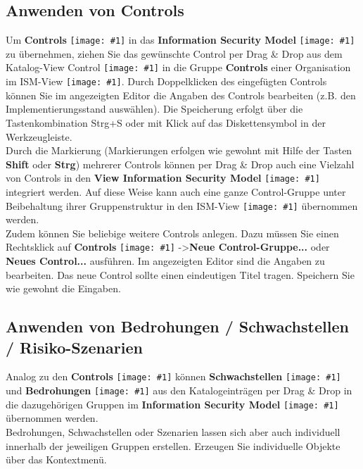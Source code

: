 \documentclass[a4paper,10pt]{book}
\newcommand{\icon}[1]{\texttt{[image: \#1]}}
\begin{document}
\subsection{Anwenden von Controls}
Um \textbf{Controls} \icon{Icon/Controls.png} in das \textbf{Information Security Model} \icon{Icon/Informationssicherheitsmodell.png} zu übernehmen,
ziehen Sie das gewünschte Control per Drag \& Drop aus dem Katalog-View Control \icon{Icon/Control_Kataloge.png} in die Gruppe
\textbf{Controls} einer Organisation im ISM-View \icon{Icon/Informationssicherheitsmodell.png}. Durch Doppelklicken des eingefügten
Controls können Sie im angezeigten Editor die Angaben des Controls bearbeiten (z.B. den Implementierungsstand auswählen).
Die Speicherung erfolgt über die Tastenkombination Strg+S oder mit Klick auf das Diskettensymbol in der Werkzeugleiste.
\newline\\
Durch die Markierung (Markierungen erfolgen wie gewohnt mit Hilfe der Tasten \textbf{Shift} oder \textbf{Strg}) mehrerer Controls können
per Drag \& Drop auch eine Vielzahl von Controls in den \textbf{View Information Security Model} \icon{Icon/Informationssicherheitsmodell.png} integriert werden.
Auf diese Weise kann auch eine ganze Control-Gruppe unter Beibehaltung ihrer Gruppenstruktur
in den ISM-View \icon{Icon/Informationssicherheitsmodell.png} übernommen werden.
\newline\\
Zudem können Sie beliebige weitere Controls anlegen. Dazu müssen Sie einen Rechtsklick auf
\textbf{Controls} \icon{Icon/Controls.png} -\textgreater \textbf{Neue Control-Gruppe...} oder \textbf{Neues Control...} ausführen. Im angezeigten Editor sind die Angaben zu bearbeiten.
Das neue Control sollte einen eindeutigen Titel tragen. Speichern Sie wie gewohnt die Eingaben.

\subsection{Anwenden von Bedrohungen / Schwachstellen / Risiko-Szenarien}
Analog zu den \textbf{Controls} \icon{Icon/Controls.png} können \textbf{Schwachstellen} \icon{Icon/Schwachstellen.png} und \textbf{Bedrohungen} \icon{Icon/Lightening.png} aus den
Katalogeinträgen per Drag \& Drop in die dazugehörigen Gruppen im \textbf{Information Security Model} \icon{Icon/Informationssicherheitsmodell.png} übernommen werden.
\newline\\
Bedrohungen, Schwachstellen oder Szenarien lassen sich aber auch individuell innerhalb der jeweiligen Gruppen erstellen. Erzeugen Sie individuelle Objekte über das Kontextmenü.
\end{document}
